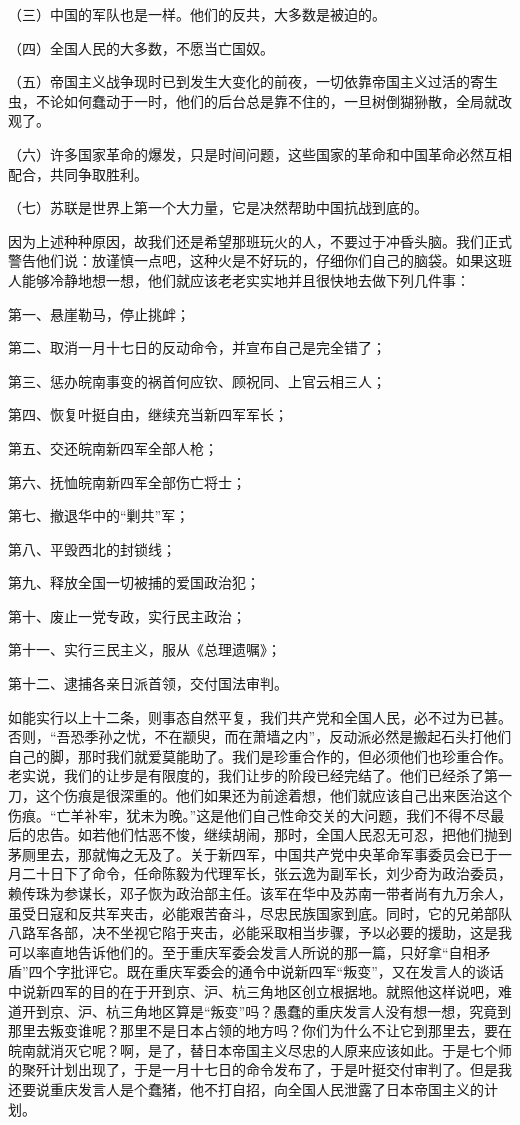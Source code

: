 （三）中国的军队也是一样。他们的反共，大多数是被迫的。

（四）全国人民的大多数，不愿当亡国奴。

（五）帝国主义战争现时已到发生大变化的前夜，一切依靠帝国主义过活的寄生虫，不论如何蠢动于一时，他们的后台总是靠不住的，一旦树倒猢狲散，全局就改观了。

（六）许多国家革命的爆发，只是时间问题，这些国家的革命和中国革命必然互相配合，共同争取胜利。

（七）苏联是世界上第一个大力量，它是决然帮助中国抗战到底的。

因为上述种种原因，故我们还是希望那班玩火的人，不要过于冲昏头脑。我们正式警告他们说：放谨慎一点吧，这种火是不好玩的，仔细你们自己的脑袋。如果这班人能够冷静地想一想，他们就应该老老实实地并且很快地去做下列几件事：

第一、悬崖勒马，停止挑衅；

第二、取消一月十七日的反动命令，并宣布自己是完全错了；

第三、惩办皖南事变的祸首何应钦、顾祝同、上官云相三人；

第四、恢复叶挺自由，继续充当新四军军长；

第五、交还皖南新四军全部人枪；

第六、抚恤皖南新四军全部伤亡将士；

第七、撤退华中的“剿共”军；

第八、平毁西北的封锁线；

第九、释放全国一切被捕的爱国政治犯；

第十、废止一党专政，实行民主政治；

第十一、实行三民主义，服从《总理遗嘱》；

第十二、逮捕各亲日派首领，交付国法审判。

如能实行以上十二条，则事态自然平复，我们共产党和全国人民，必不过为已甚。否则，“吾恐季孙之忧，不在颛臾，而在萧墙之内”，反动派必然是搬起石头打他们自己的脚，那时我们就爱莫能助了。我们是珍重合作的，但必须他们也珍重合作。老实说，我们的让步是有限度的，我们让步的阶段已经完结了。他们已经杀了第一刀，这个伤痕是很深重的。他们如果还为前途着想，他们就应该自己出来医治这个伤痕。“亡羊补牢，犹未为晚。”这是他们自己性命交关的大问题，我们不得不尽最后的忠告。如若他们怙恶不悛，继续胡闹，那时，全国人民忍无可忍，把他们抛到茅厕里去，那就悔之无及了。关于新四军，中国共产党中央革命军事委员会已于一月二十日下了命令，任命陈毅为代理军长，张云逸为副军长，刘少奇为政治委员，赖传珠为参谋长，邓子恢为政治部主任。该军在华中及苏南一带者尚有九万余人，虽受日寇和反共军夹击，必能艰苦奋斗，尽忠民族国家到底。同时，它的兄弟部队八路军各部，决不坐视它陷于夹击，必能采取相当步骤，予以必要的援助，这是我可以率直地告诉他们的。至于重庆军委会发言人所说的那一篇，只好拿“自相矛盾”四个字批评它。既在重庆军委会的通令中说新四军“叛变”，又在发言人的谈话中说新四军的目的在于开到京、沪、杭三角地区创立根据地。就照他这样说吧，难道开到京、沪、杭三角地区算是“叛变”吗？愚蠢的重庆发言人没有想一想，究竟到那里去叛变谁呢？那里不是日本占领的地方吗？你们为什么不让它到那里去，要在皖南就消灭它呢？啊，是了，替日本帝国主义尽忠的人原来应该如此。于是七个师的聚歼计划出现了，于是一月十七日的命令发布了，于是叶挺交付审判了。但是我还要说重庆发言人是个蠢猪，他不打自招，向全国人民泄露了日本帝国主义的计划。


